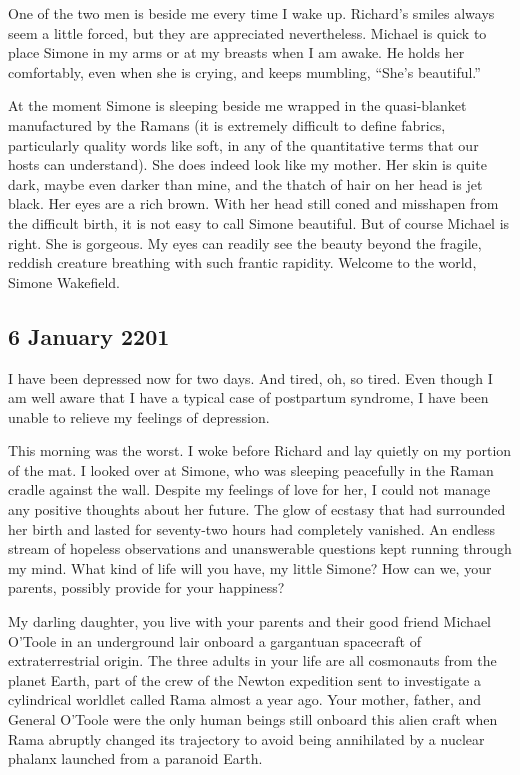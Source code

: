 \documentclass[]{article}
\begin{document}
One of the two men is beside me every time I wake up.  Richard’s smiles always seem a little forced, but they are appreciated nevertheless.  Michael is quick to place Simone in my arms or at my breasts when I am awake.  He holds her comfortably, even when she is crying, and keeps mumbling, “She’s beautiful.”

At the moment Simone is sleeping beside me wrapped in the quasi-blanket manufactured by the Ramans (it is extremely difficult to define fabrics, particularly quality words like soft, in any of the quantitative terms that our hosts can understand).  She does indeed look like my mother.  Her skin is quite dark, maybe even darker than mine, and the thatch of hair on her head is jet black.  Her eyes are a rich brown.  With her head still coned and misshapen from the difficult birth, it is not easy to call Simone beautiful.  But of course Michael is right.  She is gorgeous.  My eyes can readily see the beauty beyond the fragile, reddish creature breathing with such frantic rapidity.  Welcome to the world, Simone Wakefield.

\subsection{6 January 2201}

I have been depressed now for two days.  And tired, oh, so tired.  Even though I am well aware that I have a typical case of postpartum syndrome, I have been unable to relieve my feelings of depression.

This morning was the worst.  I woke before Richard and lay quietly on my portion of the mat.  I looked over at Simone, who was sleeping peacefully in the Raman cradle against the wall.  Despite my feelings of love for her, I could not manage any positive thoughts about her future.  The glow of ecstasy that had surrounded her birth and lasted for seventy-two hours had completely vanished.  An endless stream of hopeless observations and unanswerable questions kept running through my mind.  What kind of life will you have, my little Simone? How can we, your parents, possibly provide for your happiness?

My darling daughter, you live with your parents and their good friend Michael O’Toole in an underground lair onboard a gargantuan spacecraft of extraterrestrial origin.  The three adults in your life are all cosmonauts from the planet Earth, part of the crew of the Newton expedition sent to investigate a cylindrical worldlet called Rama almost a year ago.  Your mother, father, and General O’Toole were the only human beings still onboard this alien craft when Rama abruptly changed its trajectory to avoid being annihilated by a nuclear phalanx launched from a paranoid Earth.
\end{document}
